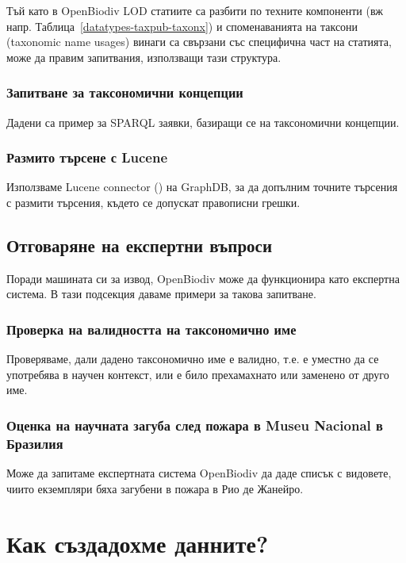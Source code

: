 Тъй като в OpenBiodiv LOD статиите са разбити по техните компоненти (вж напр. Таблица~\ref{datatypes-taxpub-taxonx}) и споменаванията на таксони (taxonomic name usages) винаги са свързани със специфична част на статията, може да правим запитвания, използващи тази структура.

\subsubsection{Запитване за таксономични концепции}

Дадени са пример за SPARQL заявки, базиращи се на таксономични концепции.

\subsubsection{Размито търсене с Lucene}

Използваме Lucene connector (\cite{ontotext_graphdb_2018}) на GraphDB, за да допълним точните търсения с размити търсения, където се допускат правописни грешки.

\subsection{Отговаряне на експертни въпроси}

Поради машината си за извод, OpenBiodiv може да функционира като експертна система. В тази подсекция даваме примери за такова запитване.

\subsubsection{Проверка на валидността на таксономично име}

Проверяваме, дали дадено таксономично име е валидно, т.е. е уместно да се употребява в научен контекст, или е било прехамахнато или заменено от друго име.

\subsubsection{Оценка на научната загуба след пожара в Museu Nacional в Бразилия}

Може да запитаме експертната система OpenBiodiv да даде списък с видовете, чиито екземпляри бяха загубени в пожара в Рио де Жанейро.

\section{Как създадохме данните?}

